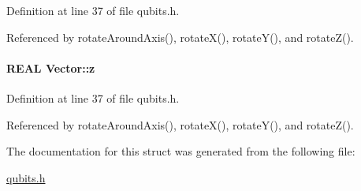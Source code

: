 Definition at line 37 of file qubits.h.

Referenced by rotateAroundAxis(), rotateX(), rotateY(), and rotateZ().\hypertarget{structVector_ad4e863651be7d6b7e2b28cd7445a0ccf}{
\paragraph[{z}]{\setlength{\rightskip}{0pt plus 5cm}REAL {\bf Vector::z}}\hfill}
\label{structVector_ad4e863651be7d6b7e2b28cd7445a0ccf}


Definition at line 37 of file qubits.h.

Referenced by rotateAroundAxis(), rotateX(), rotateY(), and rotateZ().

The documentation for this struct was generated from the following file:\begin{DoxyCompactItemize}
\item 
\hyperlink{qubits_8h}{qubits.h}\end{DoxyCompactItemize}
